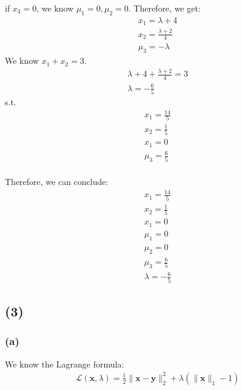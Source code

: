 \documentclass[12pt]{article}
\begin{document}
if \(x_3 = 0\), we know \(\mu_1 = 0, \mu_2 = 0\). Therefore, we get:
\begin{align*}
    x_1 = \lambda + 4 \\
    x_2 = \frac {\lambda + 2} {4} \\
    \mu_3 = -\lambda
\end{align*}
We know \(x_1 + x_2 = 3\).
\begin{align*}
    \lambda + 4 + \frac {\lambda + 2} {4} = 3 \\
    \lambda = -\frac{6}{5}
\end{align*}
s.t.
\begin{align*}
    x_1 = \frac{14}{5} \\
    x_2 = \frac{1}{5} \\
    x_1 = 0 \\
    \mu_3 = \frac{6}{5} \\
\end{align*}

Therefore, we can conclude:
\begin{align*}
    x_1 = \frac{14}{5} \\
    x_2 = \frac{1}{5} \\
    x_1 = 0 \\
    \mu_1 = 0 \\
    \mu_2 = 0 \\
    \mu_3 = \frac{6}{5} \\
    \lambda = -\frac{6}{5}
\end{align*}

\subsection{(3)}
\subsubsection{(a)}
We know the Lagrange formula:
\begin{align*}
    \mathcal{L}(\bm{x}, \lambda) = \frac{1}{2} \|\bm{x} - \bm{y}\|_2^2 + \lambda(\|\bm{x}\|_1 - 1)
\end{align*}
\end{document}
